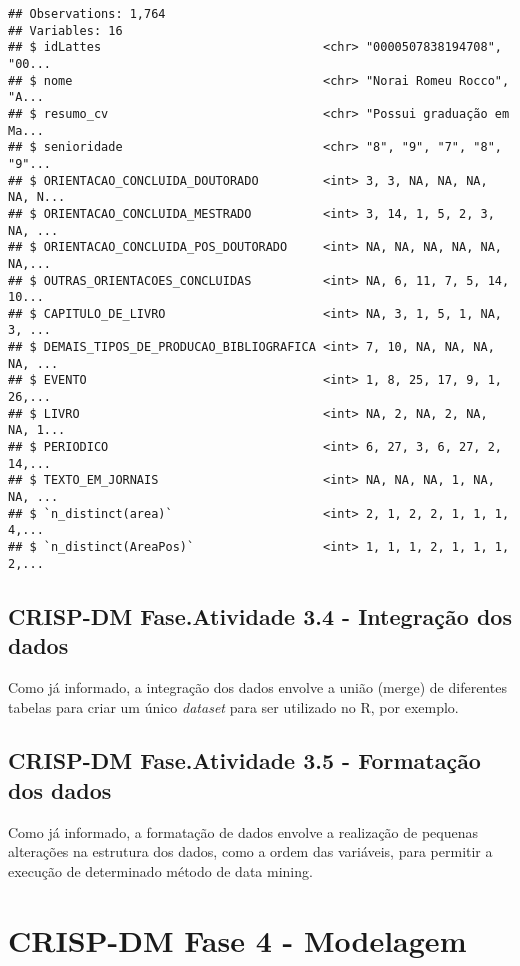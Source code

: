 \documentclass[]{article}
\begin{document}
\begin{verbatim}
## Observations: 1,764
## Variables: 16
## $ idLattes                               <chr> "0000507838194708", "00...
## $ nome                                   <chr> "Norai Romeu Rocco", "A...
## $ resumo_cv                              <chr> "Possui graduação em Ma...
## $ senioridade                            <chr> "8", "9", "7", "8", "9"...
## $ ORIENTACAO_CONCLUIDA_DOUTORADO         <int> 3, 3, NA, NA, NA, NA, N...
## $ ORIENTACAO_CONCLUIDA_MESTRADO          <int> 3, 14, 1, 5, 2, 3, NA, ...
## $ ORIENTACAO_CONCLUIDA_POS_DOUTORADO     <int> NA, NA, NA, NA, NA, NA,...
## $ OUTRAS_ORIENTACOES_CONCLUIDAS          <int> NA, 6, 11, 7, 5, 14, 10...
## $ CAPITULO_DE_LIVRO                      <int> NA, 3, 1, 5, 1, NA, 3, ...
## $ DEMAIS_TIPOS_DE_PRODUCAO_BIBLIOGRAFICA <int> 7, 10, NA, NA, NA, NA, ...
## $ EVENTO                                 <int> 1, 8, 25, 17, 9, 1, 26,...
## $ LIVRO                                  <int> NA, 2, NA, 2, NA, NA, 1...
## $ PERIODICO                              <int> 6, 27, 3, 6, 27, 2, 14,...
## $ TEXTO_EM_JORNAIS                       <int> NA, NA, NA, 1, NA, NA, ...
## $ `n_distinct(area)`                     <int> 2, 1, 2, 2, 1, 1, 1, 4,...
## $ `n_distinct(AreaPos)`                  <int> 1, 1, 1, 2, 1, 1, 1, 2,...
\end{verbatim}

\subsection{CRISP-DM Fase.Atividade 3.4 - Integração dos
dados}\label{crisp-dm-fase.atividade-3.4---integracao-dos-dados}

Como já informado, a integração dos dados envolve a união (merge) de
diferentes tabelas para criar um único \emph{dataset} para ser utilizado
no R, por exemplo.

\subsection{CRISP-DM Fase.Atividade 3.5 - Formatação dos
dados}\label{crisp-dm-fase.atividade-3.5---formatacao-dos-dados}

Como já informado, a formatação de dados envolve a realização de
pequenas alterações na estrutura dos dados, como a ordem das variáveis,
para permitir a execução de determinado método de data mining.

\section{\texorpdfstring{CRISP-DM Fase 4 -
\textbf{Modelagem}}{CRISP-DM Fase 4 - Modelagem}}\label{crisp-dm-fase-4---modelagem}
\end{document}
